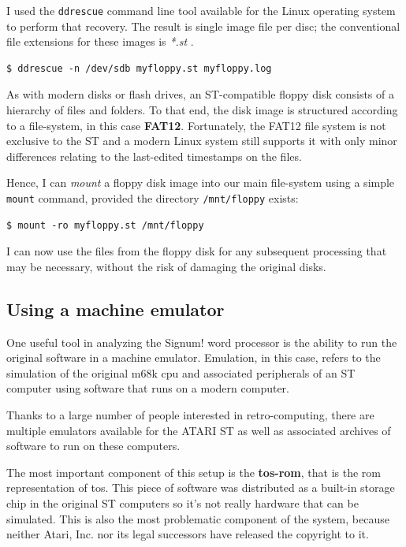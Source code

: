 I used the \texttt{ddrescue} command line tool available for the Linux operating system to perform that recovery. The result is single image file per disc; the conventional file extensions for these images is \textit{*.st} \cite{archiveteam:stdisc}.

\begin{lstlisting}[style=BashInputStyle]
$ ddrescue -n /dev/sdb myfloppy.st myfloppy.log
\end{lstlisting}

As with modern disks or flash drives, an ST-compatible floppy disk consists of a hierarchy of files and folders. To that end, the disk image is structured according to a file-system, in this case \textbf{FAT12}. Fortunately, the FAT12 file system is not exclusive to the ST and a modern Linux system still supports it with only minor differences relating to the last-edited timestamps on the files.

Hence, I can \textit{mount} a floppy disk image into our main file-system using a simple \texttt{mount} command, provided the directory \texttt{/mnt/floppy} exists:

\begin{lstlisting}[style=BashInputStyle]
$ mount -ro myfloppy.st /mnt/floppy
\end{lstlisting}

I can now use the files from the floppy disk for any subsequent processing that may be necessary, without the risk of damaging the original disks.

\subsection{Using a machine emulator}
\label{sec:emulator}

One useful tool in analyzing the Signum! word processor is the ability to run the original software in a machine emulator. Emulation, in this case, refers to the simulation of the original \acrshort{m68k} \acrshort{cpu} and associated peripherals of an ST computer using software that runs on a modern computer.

Thanks to a large number of people interested in retro-computing, there are multiple emulators available for the ATARI ST as well as associated archives of software to run on these computers. 

The most important component of this setup is the \textbf{\acrshort{tos}-\acrshort{rom}}, that is the \acrlong{rom} representation of \acrlong{tos}. This piece of software was distributed as a built-in storage chip in the original ST computers so it's not really hardware that can be simulated. This is also the most problematic component of the system, because neither Atari, Inc. nor its legal successors have released the copyright to it.

